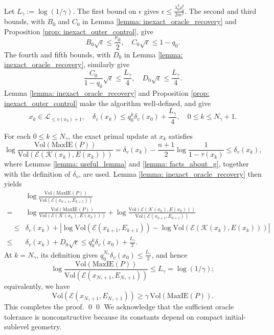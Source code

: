 \documentclass[smallextended]{svjour3}
\let\springerproof\proof
\let\endspringerproof\endproof
\renewenvironment{proof}{\springerproof}{%
  \ifhmode\qed\else\leavevmode\qed\fi\endspringerproof}
\newcommand{\V}{{\mathrm{Vol}}}
\newcommand{\K}{\mathcal{K}}
\newcommand{\E}{\mathcal{E}}
\newcommand{\MaxIE}{\mathrm{MaxIE}}
\begin{document}
\begin{proof}
    Let $L_\gamma:=\log(1/\gamma)$. The first bound on $\epsilon$ gives $\epsilon \le \frac{\lambda_0^2\rho_0^2}{2m^2}.$
    The second and third bounds, with $B_0$ and $C_0$ in Lemma \ref{lemma: inexact_oracle_recovery} and Proposition \ref{prop: inexact_outer_control}, give
    \[
        B_0\sqrt{\epsilon}\le \frac{r_0}{2},
        \quad
        C_0\sqrt{\epsilon}\le 1-q_0.
    \]
    The fourth and fifth bounds, with $D_0$ in Lemma \ref{lemma: inexact_oracle_recovery}, similarly give
    \[
        \frac{C_0}{1-q_0}\sqrt{\epsilon}\le \frac{L_\gamma}{4},
        \quad
        D_0\sqrt{\epsilon}\le \frac{L_\gamma}{4}.
    \]
    Lemma \ref{lemma: inexact_oracle_recovery}  and Proposition \ref{prop: inexact_outer_control} make the algorithm
    well-defined, and give
    \[
        x_k\in \mathcal{L}_{\leq v(x_0)+1},
        \quad
        \delta_v(x_k)
        \le
        q_0^k\delta_v(x_0)+\frac{L_\gamma}{4},
        \quad 0\leq k\leq N_\gamma+1.
    \]

    For each $0\leq k\leq N_\gamma$, the exact primal update at $x_k$ satisfies
    \[
        \log \frac{\V(\MaxIE(P))}{\V(\E(\K(x_k),E(x_k)))}
        =
        \delta_v(x_k)-\frac{n+1}{2}\log \frac{1}{1-\tau(x_k)}
        \le
        \delta_v(x_k),
    \]
    where Lemmas \ref{lemma: useful_lemma} and
    \ref{lemma: facts_about_g}, together with the definition of
    $\delta_v$, are used.
    Lemma \ref{lemma: inexact_oracle_recovery} then yields
    \begin{align*}
        &\log \frac{\V(\MaxIE(P))}{\V(\E(x_{k+1},E_{k+1}))} \\
        = & \log \frac{\V(\MaxIE(P))}{\V(\E(\K(x_k),E(x_k)))}  + \log \frac{\V(\E(\K(x_k),E(x_k)))}{\V(\E(x_{k+1},E_{k+1}))} \\
        \quad\le & \delta_v(x_k) +
        \left|
            \log\V(\E(x_{k+1},E_{k+1}))
            -
            \log\V(\E(\K(x_k),E(x_k)))
        \right| \\
        \le & \delta_v(x_k)+D_0\sqrt{\epsilon} \le q_0^k\delta_v(x_0)+\frac{L_\gamma}{2}.
    \end{align*}
    At $k=N_\gamma$, its definition gives $ q_0^{N_\gamma}\delta_v(x_0)\le \frac{L_\gamma}{2}$, and hence
    \[
        \log \frac{\V(\MaxIE(P))}{\V(\E(x_{N_\gamma+1},E_{N_\gamma+1}))}
        \le
        L_\gamma
        =
        \log(1/\gamma);
    \]
    equivalently, we have 
    \[
        \V(\E(x_{N_\gamma+1},E_{N_\gamma+1}))
        \ge
        \gamma\,\V(\MaxIE(P)).
    \]
    This completes the proof.
\end{proof}
We acknowledge that the sufficient oracle tolerance is nonconstructive because its constants depend
on compact initial-sublevel geometry.
\end{document}
